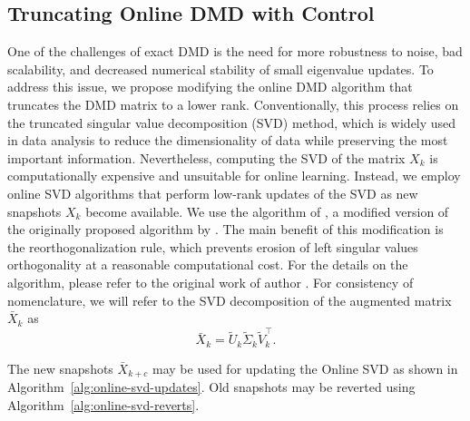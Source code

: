 \subsection{Truncating Online DMD with Control}\label{sec:truncating-online-dmd}
One of the challenges of exact DMD is the need for more robustness to noise, bad scalability, and decreased numerical stability of small eigenvalue updates. To address this issue, we propose modifying the online DMD algorithm that truncates the DMD matrix to a lower rank. Conventionally, this process relies on the truncated singular value decomposition (SVD) method, which is widely used in data analysis to reduce the dimensionality of data while preserving the most important information. Nevertheless, computing the SVD of the matrix \(X_k\) is computationally expensive and unsuitable for online learning. Instead, we employ online SVD algorithms that perform low-rank updates of the SVD as new snapshots \(X_k\) become available. We use the algorithm of \citet{Zhang2022}, a modified version of the originally proposed algorithm by \citet{Brand2006}. The main benefit of this modification is the reorthogonalization rule, which prevents erosion of left singular values orthogonality at a reasonable computational cost. For the details on the algorithm, please refer to the original work of author \citep{Zhang2022}. For consistency of nomenclature, we will refer to the SVD decomposition of the augmented matrix \(\bar{X}_k\) as
\begin{equation*}
    \bar{X}_k = \tilde{U}_k \tilde{\Sigma}_k \tilde{V}_k^\top.
\end{equation*}

The new snapshots \(\bar{X}_{k+c}\) may be used for updating the Online SVD as shown in Algorithm~\ref{alg:online-svd-updates}. Old snapshots may be reverted using Algorithm~\ref{alg:online-svd-reverts}.

